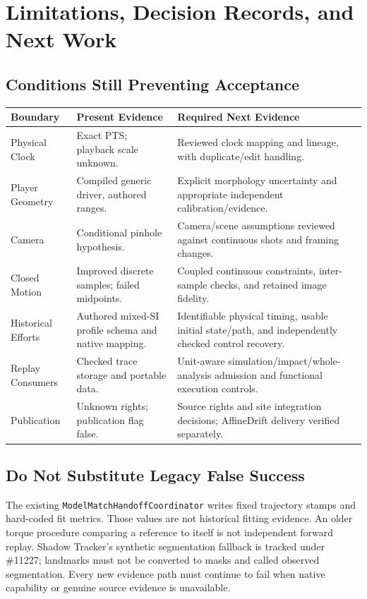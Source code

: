\documentclass[11pt,letterpaper]{article}
\newcommand{\code}[1]{\nolinkurl{#1}}
\newcommand{\reportsection}[1]{\section{#1}}
\begin{document}
\reportsection{Limitations, Decision Records, and Next Work}
\subsection{Conditions Still Preventing Acceptance}
\begin{longtable}{@{}p{1.35in}p{2.3in}p{2.8in}@{}}
\toprule
Boundary & Present Evidence & Required Next Evidence\\\midrule
Physical Clock & Exact PTS; playback scale unknown. & Reviewed clock mapping and lineage, with duplicate/edit handling.\\
Player Geometry & Compiled generic driver, authored ranges. & Explicit morphology uncertainty and appropriate independent calibration/evidence.\\
Camera & Conditional pinhole hypothesis. & Camera/scene assumptions reviewed against continuous shots and framing changes.\\
Closed Motion & Improved discrete samples; failed midpoints. & Coupled continuous constraints, inter-sample checks, and retained image fidelity.\\
Historical Efforts & Authored mixed-SI profile schema and native mapping. & Identifiable physical timing, usable initial state/path, and independently checked control recovery.\\
Replay Consumers & Checked trace storage and portable data. & Unit-aware simulation/impact/whole-analysis admission and functional execution controls.\\
Publication & Unknown rights; publication flag false. & Source rights and site integration decisions; AffineDrift delivery verified separately.\\
\bottomrule
\end{longtable}

\subsection{Do Not Substitute Legacy False Success}
The existing \code{ModelMatchHandoffCoordinator} writes fixed trajectory stamps
and hard-coded fit metrics. Those values are not historical fitting evidence.
An older torque procedure comparing a reference to itself is not independent
forward replay. Shadow Tracker's synthetic segmentation fallback is tracked
under \#11227; landmarks must not be converted to masks and called observed
segmentation. Every new evidence path must continue to fail when native
capability or genuine source evidence is unavailable.
\end{document}
